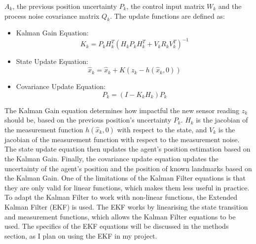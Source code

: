 \documentclass[12pt]{article}
\begin{document}
\(A_{k}\), the previous position uncertainty \(P_{k}\), the control input matrix \(W_{k}\) and the process noise covariance matrix \(Q_{k}\).
The update functions are defined as:
\begin{itemize}
    \item Kalman Gain Equation:
    \begin{equation}
        K_k = P_{k} H_k^T (H_k P_{k} H_k^T + V_k R_k V_k^T)^{-1}
    \end{equation}
    \item State Update Equation:
    \begin{equation}
        \hat{x}_{k} = \hat{x}_{k} + K(z_k - h(\hat{x}_{k}, 0))
    \end{equation}
    \item Covariance Update Equation:
    \begin{equation}
        P_{k} = (I - K_k H_k) P_k
    \end{equation}
\end{itemize}
The Kalman Gain equation determines how impactful the new sensor reading \(z_k\) should be, based on the previous position's
uncertainty \(P_{k}\). \(H_k\) is the jacobian of the measurement function \(h(\hat{x}_{k}, 0)\) with respect to the state, and \(V_k\) is the jacobian of the measurement function with respect to the measurement noise.
The state update equation then updates the agent's position estimation based on the Kalman Gain.
Finally, the covariance update equation updates the uncertainty of the agent's position and the position of known landmarks based on the Kalman Gain.
One of the limitations of the Kalman Filter equations is that they are only valid for linear functions, which makes them less useful in practice.
To adapt the Kalman Filter to work with non-linear functions, the Extended Kalman Filter (EKF) is used.
The EKF works by linearising the state transition and measurement functions, which allows the Kalman Filter equations to be used.
The specifics of the EKF equations will be discussed in the methods section, as I plan on using the EKF in my project.\\
\end{document}
